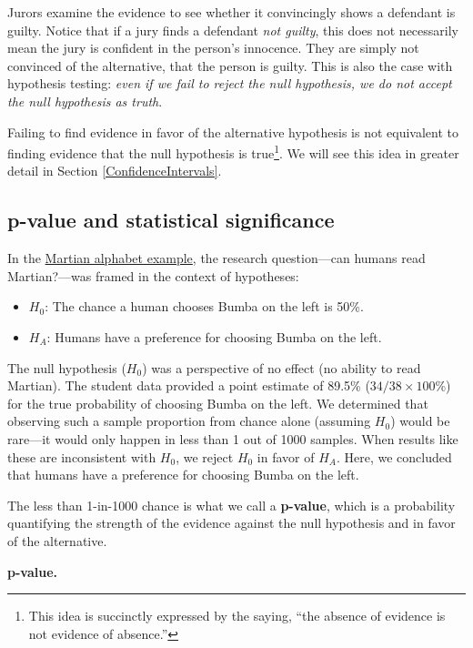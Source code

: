 \documentclass[
  10pt,
  openany]{book}
\theoremstyle{definition}
\theoremstyle{definition}
\theoremstyle{definition}
\theoremstyle{definition}
\theoremstyle{remark}
\begin{document}
Jurors examine the evidence to see whether it convincingly shows a defendant is guilty.
Notice that if a jury finds a defendant \emph{not guilty}, this does not necessarily mean the jury is confident in the person's innocence.
They are simply not convinced of the alternative, that the person is guilty.
This is also the case with hypothesis testing: \emph{even if we fail to reject the null hypothesis, we do not accept the null hypothesis as truth}.

Failing to find evidence in favor of the alternative hypothesis is not equivalent to finding evidence that the null hypothesis is true\footnote{This idea is succinctly expressed by the saying, ``the absence of evidence is not evidence of absence.''}.
We will see this idea in greater detail in Section \ref{ConfidenceIntervals}.

\subsection{p-value and statistical significance}\label{p-value-stat-signif}

In the \hyperref[Martian]{Martian alphabet example}, the research question---can humans read Martian?---was framed in the context of hypotheses:

\begin{itemize}
\item
  \(H_0\): The chance a human chooses Bumba on the left is 50\%.
\item
  \(H_A\): Humans have a preference for choosing Bumba on the left.
\end{itemize}

The null hypothesis (\(H_0\)) was a perspective of no effect (no ability to read Martian). The student data provided a point estimate of 89.5\% (\(34/38 \times 100\)\%) for the true probability of choosing Bumba on the left. We determined that observing such a sample proportion from chance alone (assuming \(H_0\)) would be rare---it would only happen in less than 1 out of 1000 samples. When results like these are inconsistent with \(H_0\), we reject \(H_0\) in favor of \(H_A\). Here, we concluded that humans have a preference for choosing Bumba on the left.

The less than 1-in-1000 chance is what we call a \textbf{p-value}, which is a probability quantifying the strength of the evidence against the null hypothesis and in favor of the alternative.

\textbf{p-value.}
\end{document}
